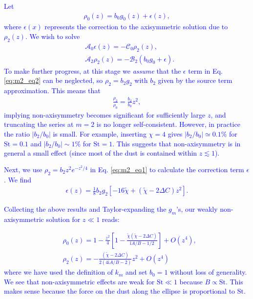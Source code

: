 \documentclass[apj]{emulateapj}
\def\blue#1{\textcolor{blue}{#1}}
\begin{document}
\blue{
Let
\begin{align}
\rho_0(z) = b_0g_0(z) + \epsilon(z),
\end{align}
where $\epsilon(x)$ represents the correction to the axisymmetric
solution due to $\rho_2(z)$. We wish to solve
}
\blue{
\begin{align}
&\mathcal{A}_0\epsilon(z) = -\mathcal{C}_0\rho_2(z),\label{eq:m2_eq1}\\
&\mathcal{A}_2\rho_2(z)   = -\mathcal{B}_2\left(b_0g_0 + \epsilon\right).\label{eq:m2_eq2}
\end{align}
To make further progress, at this stage we \emph{assume} that the
$\epsilon$ term in Eq. \ref{eq:m2_eq2} can be neglected, so $\rho_2 = b_2 g_2$ with $b_2$ given by the source term approximation. 
This means that  
}
\blue{
\begin{align}
\frac{\rho_2}{\rho_0} = \frac{b_2}{b_0}z^2,
\end{align}
}
\blue{
implying non-axisymmetry becomes significant for sufficiently large $z$, 
and truncating the series at $m=2$ is no longer self-consistent. 
However, in practice the ratio $|b_2/b_0|$ is small. 
For example, inserting $\chi=4$ gives $|b_2/b_0|\simeq0.1\%$ for $\mathrm{St}=0.1$ and $|b_2/b_0|\sim 1\%$ for $\mathrm{St}=1$. This suggests that non-axisymmetry is in general a small effect (since most of the dust is contained
within $z\lesssim 1$). 
}

\blue{
Next, we use $\rho_2 = b_2 z^2e^{-z^2/4}$ in Eq. \ref{eq:m2_eq1} to
calculate the correction term $\epsilon$. We find
}
\blue{
\begin{align}
\epsilon(z) = \frac{1}{8}b_2g_2\left[-16\tilde{\chi}+\left(\tilde{\chi} - 2\Delta C\right)z^2\right].
\end{align}
}

\blue{
Collecting the above results and Taylor-expanding the $g_m$'s, our
weakly non-axisymmetric solution for $z\ll 1$ reads:
}

\blue{
\begin{align}
&\rho_0(z) =1 -
  \frac{z^2}{4}\left[1-\frac{\tilde{\chi}\left(\tilde{\chi} - 2\Delta C\right)}{\mathrm{i}A/B - 1/2}\right]
+ O(z^4),\\
&\rho_2(z) =-\frac{\left(\tilde{\chi} - 2\Delta C\right)}{2\left(4\mathrm{i}A/B - 2\right)}z^2+O(z^4)
\end{align}
where we have used the definition of $k_m$ and set $b_0=1$ without loss of generality. We see that non-axisymmetric effects are weak for $\mathrm{St}\ll1$ because $B\propto \mathrm{St}$.  This makes sense because the force on the dust along the ellipse is proportional to $\mathrm{St}$. 
}
\end{document}
